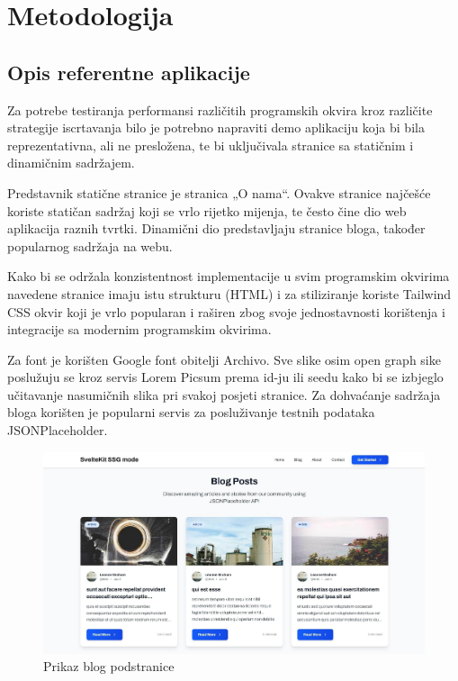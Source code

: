 \section{Metodologija}

\subsection{Opis referentne aplikacije}

Za potrebe testiranja performansi različitih programskih okvira kroz različite strategije iscrtavanja bilo je potrebno napraviti demo aplikaciju koja bi bila reprezentativna, ali ne presložena, te bi uključivala stranice sa statičnim i dinamičnim sadržajem.

\bigskip

Predstavnik statične stranice je stranica „O nama“. Ovakve stranice najčešće koriste statičan sadržaj koji se vrlo rijetko mijenja, te često čine dio web aplikacija raznih tvrtki. Dinamični dio predstavljaju stranice bloga, također popularnog sadržaja na webu.

\bigskip

Kako bi se održala konzistentnost implementacije u svim programskim okvirima navedene stranice imaju istu strukturu (HTML) i za stiliziranje koriste Tailwind CSS okvir koji je vrlo popularan i raširen zbog svoje jednostavnosti korištenja i integracije sa modernim programskim okvirima.

\bigskip

Za font je korišten Google font obitelji Archivo. Sve slike osim open graph sike poslužuju se kroz servis Lorem Picsum prema id-ju ili seedu kako bi se izbjeglo učitavanje nasumičnih slika pri svakoj posjeti stranice. Za dohvaćanje sadržaja bloga korišten je popularni servis za posluživanje testnih podataka JSONPlaceholder.

\bigskip

\begin{figure}[H]
    \centering
    \includegraphics[width=\textwidth]{slike/metodologija/prikaz-blog-stranice.jpg}
    \caption{Prikaz blog podstranice}
    \label{fig:prikaz-blog-stranice}
\end{figure}

